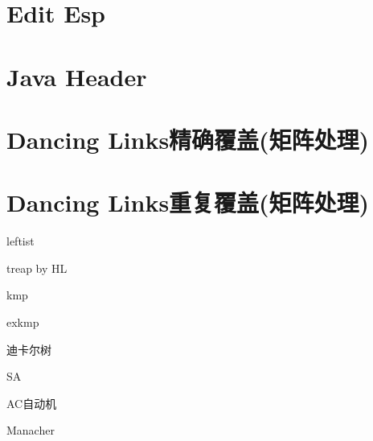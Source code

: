 \documentclass[
	10pt,
	twocolumn,
	a4paper,
]{article}
\begin{document}
\section{Edit Esp}

\section{Java Header}

\section{Dancing Links精确覆盖(矩阵处理)}

\section{Dancing Links重复覆盖(矩阵处理)}


leftist

treap by HL

kmp

exkmp

迪卡尔树

SA

AC自动机

Manacher
\end{document}

